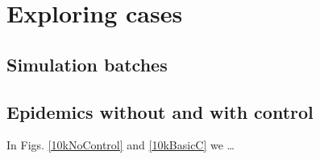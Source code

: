\documentclass[graybox]{svmult}
\begin{document}
\section{Exploring cases}
\label{exploring}

\subsection{Simulation batches}
\label{batches}

\subsection{Epidemics without and with control}
\label{withoutWith}

In Figs. \ref{10kNoControl} and \ref{10kBasicC} we \ldots
\end{document}
